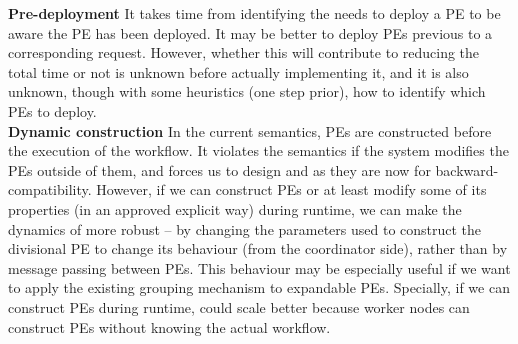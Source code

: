 \textbf{Pre-deployment}\quad
It takes time from identifying the needs to deploy a PE to be aware the PE has been deployed. It may be better to deploy PEs previous to a corresponding request. However, whether this will contribute to reducing the total time or not is unknown before actually implementing it, and it is also unknown, though with some heuristics (\eg one step prior), how to identify which PEs to deploy. \\

\textbf{Dynamic construction}\quad
In the current \dpy semantics, PEs are constructed before the execution of the workflow. It violates the semantics if the system modifies the PEs outside of them, and forces us to design \tincdep and \tdynexp as they are now for backward-compatibility. However, if we can construct PEs or at least modify some of its properties (in an approved explicit way) during runtime, we can make the dynamics of \tdynexp more robust -- by changing the parameters used to construct the divisional PE to change its behaviour (from the coordinator side), rather than by message passing between PEs. This behaviour may be especially useful if we want to apply the existing grouping mechanism to expandable PEs. Specially, if we can construct PEs during runtime, \tincdep could scale better because worker nodes can construct PEs without knowing the actual workflow. 

